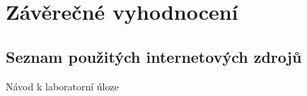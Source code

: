\documentclass[a4paper,12pt]{article}   %
\begin{document}
\section{Závěrečné vyhodnocení}


\clearpage
\renewcommand{\refname}{Seznam použité literatury a~zdrojů informací} 

\begin{thebibliography}{99}

\subsection*{Seznam použitých internetových zdrojů}
     Návod k laboratorní úloze
    
\end{thebibliography}
\end{document}
